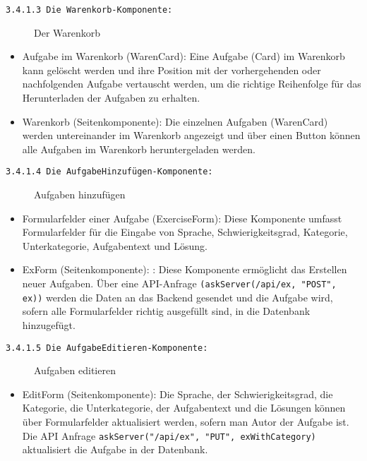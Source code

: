 \newpage
\texttt{3.4.1.3 Die Warenkorb-Komponente:}


\begin{figure}[H]
  \caption{Der Warenkorb \cite{fig:warenkorb}}
\end{figure}

\begin{itemize}

\item Aufgabe im Warenkorb (WarenCard):
Eine Aufgabe (Card) im Warenkorb kann gelöscht werden und ihre Position mit der vorhergehenden oder nachfolgenden Aufgabe vertauscht werden, um die richtige Reihenfolge für das Herunterladen der Aufgaben zu erhalten. 


\item Warenkorb (Seitenkomponente):
Die einzelnen Aufgaben (WarenCard) werden untereinander im Warenkorb angezeigt und über einen Button können alle Aufgaben im Warenkorb heruntergeladen werden.


\end{itemize}

\texttt{3.4.1.4 Die AufgabeHinzufügen-Komponente:}
\begin{figure}[H]
  \caption{Aufgaben hinzufügen \cite{fig:hinzufuegen}}
\end{figure}

\begin{itemize}

\item{Formularfelder einer Aufgabe (ExerciseForm)}:
Diese Komponente umfasst Formularfelder für die Eingabe von Sprache, Schwierigkeitsgrad, Kategorie, Unterkategorie, Aufgabentext und Lösung.

\item ExForm (Seitenkomponente): :
Diese Komponente ermöglicht das Erstellen neuer Aufgaben. Über eine API-Anfrage \texttt{(askServer(/api/ex, "POST", ex))} werden die Daten an das Backend gesendet und die Aufgabe wird, sofern alle Formularfelder richtig ausgefüllt sind, in die Datenbank hinzugefügt.


\end{itemize}

\texttt{3.4.1.5 Die AufgabeEditieren-Komponente:}
\begin{figure}[H]
  \caption{Aufgaben editieren \cite{fig:editieren}}
\end{figure}

\begin{itemize}
\item{EditForm} (Seitenkomponente):
Die Sprache, der Schwierigkeitsgrad, die Kategorie, die Unterkategorie, der Aufgabentext und die Lösungen können über Formularfelder aktualisiert werden, sofern man Autor der Aufgabe ist.
Die API Anfrage \texttt{askServer("/api/ex", "PUT", exWithCategory)} aktualisiert die Aufgabe in der Datenbank.


\end{itemize}
